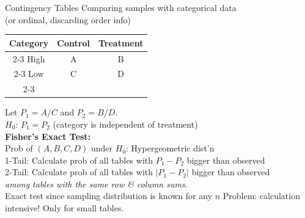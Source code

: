 \begin{frame}{Contingency Tables}
Comparing samples with categorical data\\
(or ordinal, discarding order info)

\begin{center}
    \begin{tabular}{c|c|c|}
         Category & Control & Treatment \\   
         \cline{2-3}
         High & A & B  \\
         \cline{2-3}
         Low & C & D \\
         \cline{2-3}
    \end{tabular}
\end{center}
\br
Let $P_1=A/C$ and $P_2=B/D$.\\
$H_0$: $P_1 = P_2$ (category is independent of treatment)\\
\textbf{Fisher's Exact Test:}\\
Prob of $(A,B,C,D)$ under $H_0$: Hypergeometric dist'n\\
1-Tail: Calculate prob of all tables with $P_1-P_2$ bigger than observed\\
2-Tail: Calculate prob of all tables with $|P_1-P_2|$ bigger than observed\\
\emph{among tables with the same row \& column sums}.\\
Exact test since sampling distribution is known for any $n$
\br
Problem: calculation intensive! Only for small tables.
\end{frame}

